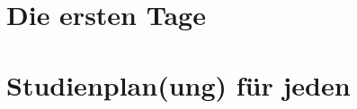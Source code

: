 \documentclass[]{papertex}
\begin{document}
  \begin{multicols}{2}
  \thispagestyle{empty}
  \clearpage
  \setcounter{page}{1}
  
\end{multicols}
  \newpage
  \clearpage
  \newpage
\section{Die ersten Tage}
\begin{multicols}{2}


 \end{multicols}
\section{Studienplan(ung) für jeden}
\begin{multicols}{2}
  
   
  
  
  
  
  \end{multicols}
\end{document}
